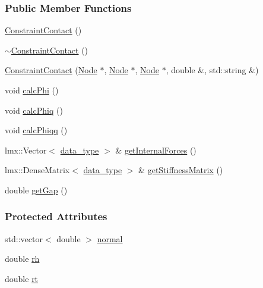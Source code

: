 \subsubsection*{Public Member Functions}
\begin{DoxyCompactItemize}
\item 
\hyperlink{classmknix_1_1_constraint_contact_a76498ab5af03df8fd8c850f67ac54d33}{Constraint\-Contact} ()
\item 
\hyperlink{classmknix_1_1_constraint_contact_a2570dc3ad5c593871f1d5dd4e6302f07}{$\sim$\-Constraint\-Contact} ()
\item 
\hyperlink{classmknix_1_1_constraint_contact_abfcda7ac9dc63a790078f2fb26497a6e}{Constraint\-Contact} (\hyperlink{classmknix_1_1_node}{Node} $\ast$, \hyperlink{classmknix_1_1_node}{Node} $\ast$, \hyperlink{classmknix_1_1_node}{Node} $\ast$, double \&, std\-::string \&)
\item 
void \hyperlink{classmknix_1_1_constraint_contact_a21a89037754ef5d968bda199ad3f1858}{calc\-Phi} ()
\item 
void \hyperlink{classmknix_1_1_constraint_contact_a88c495ea01a5f8f8807dd72ae3e7240f}{calc\-Phiq} ()
\item 
void \hyperlink{classmknix_1_1_constraint_contact_ad9b4db34bf76f2d8ea9532d5d3e0449f}{calc\-Phiqq} ()
\item 
lmx\-::\-Vector$<$ \hyperlink{namespacemknix_a16be4b246fbf2cceb141e3a179111020}{data\-\_\-type} $>$ \& \hyperlink{classmknix_1_1_constraint_contact_ae4ebea11a39b4cf89ce317154abc99e3}{get\-Internal\-Forces} ()
\item 
lmx\-::\-Dense\-Matrix$<$ \hyperlink{namespacemknix_a16be4b246fbf2cceb141e3a179111020}{data\-\_\-type} $>$ \& \hyperlink{classmknix_1_1_constraint_contact_abb4cb7497d2cbef540add289fdf8492e}{get\-Stiffness\-Matrix} ()
\item 
double \hyperlink{classmknix_1_1_constraint_contact_a4fcfe47c1421fd375ff806b8ef411f47}{get\-Gap} ()
\end{DoxyCompactItemize}
\subsubsection*{Protected Attributes}
\begin{DoxyCompactItemize}
\item 
std\-::vector$<$ double $>$ \hyperlink{classmknix_1_1_constraint_contact_a06ba5460d950b98b85226e7b9b520df2}{normal}
\item 
double \hyperlink{classmknix_1_1_constraint_contact_a86b0413ea70c74a38f8610a88cba48c6}{rh}
\item 
double \hyperlink{classmknix_1_1_constraint_contact_a0a2b6bbee4925e12f4921aa58f0f3426}{rt}
\end{DoxyCompactItemize}


